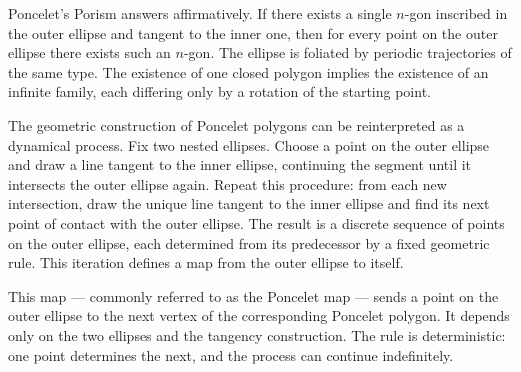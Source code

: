 Poncelet’s Porism answers affirmatively. If there exists a single $n$-gon inscribed in the outer ellipse and tangent to the inner one, then for every point on the outer ellipse there exists such an $n$-gon. The ellipse is foliated by periodic trajectories of the same type. The existence of one closed polygon implies the existence of an infinite family, each differing only by a rotation of the starting point.

\begin{center}
\end{center}

The geometric construction of Poncelet polygons can be reinterpreted as a dynamical process. Fix two nested ellipses. Choose a point on the outer ellipse and draw a line tangent to the inner ellipse, continuing the segment until it intersects the outer ellipse again. Repeat this procedure: from each new intersection, draw the unique line tangent to the inner ellipse and find its next point of contact with the outer ellipse. The result is a discrete sequence of points on the outer ellipse, each determined from its predecessor by a fixed geometric rule. This iteration defines a map from the outer ellipse to itself.

This map — commonly referred to as the Poncelet map — sends a point on the outer ellipse to the next vertex of the corresponding Poncelet polygon. It depends only on the two ellipses and the tangency construction. The rule is deterministic: one point determines the next, and the process can continue indefinitely.

